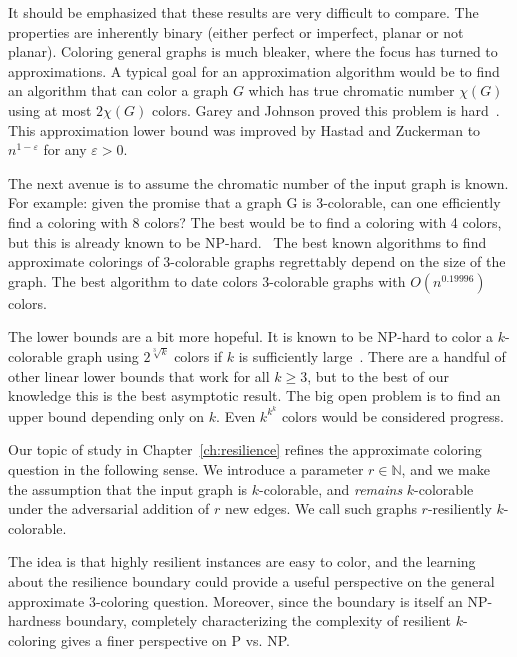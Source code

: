 It should be emphasized that these results are very difficult to compare.  The
properties are inherently binary (either perfect or imperfect, planar or not
planar). Coloring general graphs is much bleaker, where the focus has turned to
approximations. A typical goal for an approximation algorithm would be to find
an algorithm that can color a graph $G$ which has true chromatic number
$\chi(G)$ using at most $2\chi(G)$ colors. Garey and Johnson proved this
problem is hard~\cite{GareyJ79}.  This approximation lower bound was improved
by Hastad and Zuckerman to $n^{1-\varepsilon}$ for any $\varepsilon >
0$.~\cite{Ha99,Zu07}

The next avenue is to assume the chromatic number of the input graph is known.
For example: given the promise that a graph G is 3-colorable, can one
efficiently find a coloring with 8 colors? The best would be to find a coloring
with 4 colors, but this is already known to be NP-hard.~\cite{GuKh2000} The
best known algorithms to find approximate colorings of 3-colorable graphs
regrettably depend on the size of the graph. The best algorithm to date colors
3-colorable graphs with $O(n^{0.19996})$ colors.~\cite{KawarabayashiT14} 

The lower bounds are a bit more hopeful. It is known to be NP-hard to color a
$k$-colorable graph using $2^{\sqrt[3]{k}}$ colors if $k$ is sufficiently
large~\cite{Huang13}.  There are a handful of other linear lower bounds that
work for all $k \geq 3$, but to the best of our knowledge this is the best
asymptotic result. The big open problem is to find an upper bound depending
only on $k$. Even $k^{k^k}$ colors would be considered progress.

Our topic of study in Chapter~\ref{ch:resilience} refines the approximate
coloring question in the following sense. We introduce a parameter $r \in
\mathbb{N}$, and we make the assumption that the input graph is $k$-colorable,
and \emph{remains} $k$-colorable under the adversarial addition of $r$ new
edges. We call such graphs $r$-resiliently $k$-colorable. 

The idea is that highly resilient instances are easy to color, and the learning
about the resilience boundary could provide a useful perspective on the general
approximate 3-coloring question. Moreover, since the boundary is itself an
NP-hardness boundary, completely characterizing the complexity of resilient
$k$-coloring gives a finer perspective on P vs. NP.

